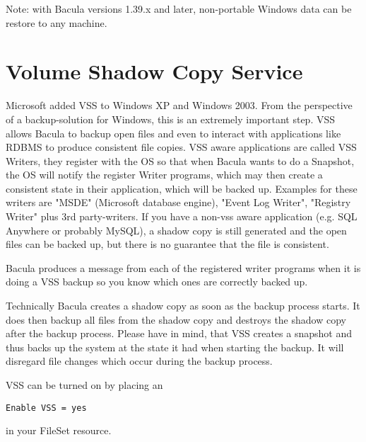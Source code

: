 Note: with Bacula versions 1.39.x and later, non-portable Windows data can
be restore to any machine.


\label{VSS}
\section{Volume Shadow Copy Service}
Microsoft added VSS to Windows XP and Windows 2003. From the perspective of
a backup-solution for Windows, this is an extremely important step. VSS
allows Bacula to backup open files and even to interact with applications like
RDBMS to produce consistent file copies. VSS aware applications are called
VSS Writers, they register with the OS so that when Bacula wants to do a
Snapshot, the OS will notify the register Writer programs, which may then
create a consistent state in their application, which will be backed up.
Examples for these writers are "MSDE" (Microsoft database
engine), "Event Log Writer", "Registry Writer" plus 3rd
party-writers.  If you have a non-vss aware application (e.g.
SQL Anywhere or probably MySQL), a shadow copy is still generated
and the open files can be backed up, but there is no guarantee
that the file is consistent.

Bacula produces a message from each of the registered writer programs
when it is doing a VSS backup so you know which ones are correctly backed
up.

Technically Bacula creates a shadow copy as soon as the backup process
starts. It does then backup all files from the shadow copy and destroys the
shadow copy after the backup process. Please have in mind, that VSS
creates a snapshot and thus backs up the system at the state it had
when starting the backup. It will disregard file changes which occur during
the backup process.

VSS can be turned on by placing an

\begin{verbatim}
Enable VSS = yes
\end{verbatim}

in your FileSet resource. 

